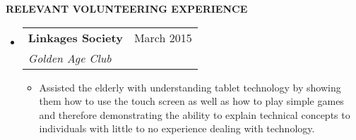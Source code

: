 \documentclass[letterpaper,11pt]{article}
\makeatletter
\newcommand{\resitem}[1]{\item #1 \vspace{-2pt}}
\newcommand{\resheading}[1]{{\large \colorbox{mygrey}{\begin{minipage}{\textwidth}{\textbf{#1 \vphantom{p\^{E}}}}\end{minipage}}}}
\newcommand{\ressubheading}[4]{
\begin{tabular*}{7.0in}{l@{\extracolsep{\fill}}r}
		\textbf{#1} & #2 \\
		\textit{#3} & \textit{#4} \\
\end{tabular*}\vspace{-6pt}}
\makeatother
\begin{document}
\resheading{RELEVANT VOLUNTEERING EXPERIENCE}
\begin{itemize}
\item
	\ressubheading{Linkages Society}{March 2015}{Golden Age Club}{}
	\begin{itemize}
	\resitem{Assisted the elderly with understanding tablet technology by showing them how to use the touch screen as well as how to play simple games and therefore demonstrating the ability to explain technical concepts to individuals with little to no experience dealing with technology.}
	\end{itemize}

\end{itemize}
\end{document}
